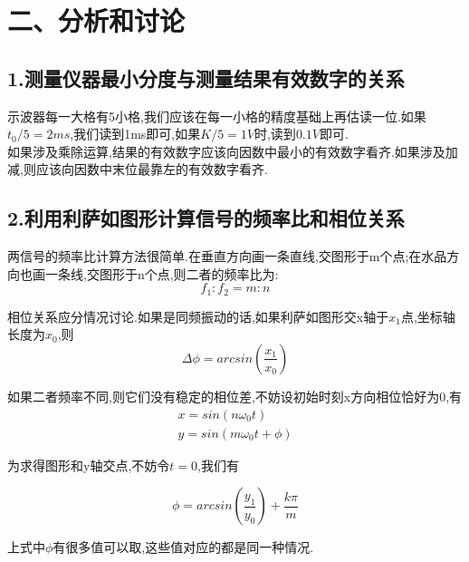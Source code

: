 \documentclass[a4paper,10pt,notitlepage]{report}
\begin{document}
\section*{二、分析和讨论}
\subsection*{1.测量仪器最小分度与测量结果有效数字的关系}
	
	示波器每一大格有5小格,我们应该在每一小格的精度基础上再估读一位.如果$t_0/5=2ms$,我们读到1ms即可,如果$K/5=1V$时,读到$0.1V$即可. \\
	
	如果涉及乘除运算,结果的有效数字应该向因数中最小的有效数字看齐.如果涉及加减,则应该向因数中末位最靠左的有效数字看齐. \\
	
\subsection*{2.利用利萨如图形计算信号的频率比和相位关系}

	两信号的频率比计算方法很简单.在垂直方向画一条直线,交图形于m个点;在水品方向也画一条线,交图形于n个点,则二者的频率比为: \\
	
\begin{equation}
	f_1 : f_2 = m : n
\end{equation}

	相位关系应分情况讨论.如果是同频振动的话,如果利萨如图形交x轴于$x_1$点,坐标轴长度为$x_0$,则 \\
	
\begin{equation}
	\Delta \phi = arcsin(\frac{x_1}{x_0})
\end{equation}

	如果二者频率不同,则它们没有稳定的相位差,不妨设初始时刻x方向相位恰好为0,有 \\
	
\begin{align}
	x = sin(n\omega_0 t) \\
	y = sin(m\omega_0 t + \phi) 
\end{align}

	为求得图形和y轴交点,不妨令$t=0$,我们有
	
\begin{equation}
	\phi = arcsin(\frac{y_1}{y_0}) + \frac{k\pi}{m}
\end{equation}

	上式中$\phi$有很多值可以取,这些值对应的都是同一种情况. \\
	
\end{document}
